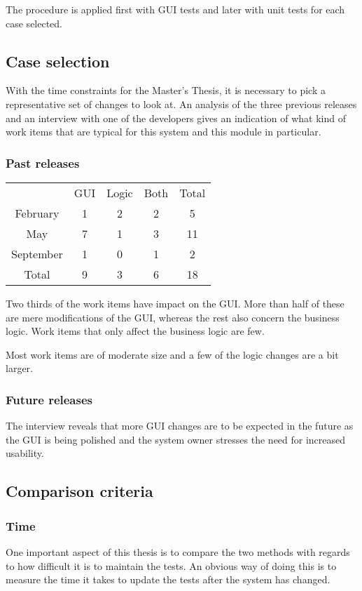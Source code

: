 \documentclass{article}
\begin{document}
		The procedure is applied first with GUI tests and later with unit tests for each case selected.

		\subsection{Case selection}
		With the time constraints for the Master's Thesis, it is necessary to pick a representative set of changes to look at.
		An analysis of the three previous releases and an interview with one of the developers gives an indication of what kind of work items that are typical for this system and this module in particular.

		\subsubsection{Past releases}
		
		\begin{tabular}{ c | c c c | c}
					 	& GUI & Logic & Both & Total\\
			February 	& 1 	& 2 	& 2 	& 5\\
			May 		& 7 	& 1 	& 3 	& 11\\
			September 	& 1 	& 0 	& 1 	& 2\\
			\hline
			Total 		& 9 	& 3 	& 6 	& 18\\
		\end{tabular}


		Two thirds of the work items have impact on the GUI. More than half of these are mere modifications of the GUI, whereas the rest also concern the business logic. Work items that only affect the business logic are few.

		Most work items are of moderate size and a few of the logic changes are a bit larger.
		
		\subsubsection{Future releases}
		The interview reveals that more GUI changes are to be expected in the future as the GUI is being polished and the system owner stresses the need for increased usability. 

		\subsection{Comparison criteria}
			\subsubsection{Time}
			One important aspect of this thesis is to compare the two methods with regards to how difficult it is to maintain the tests. An obvious way of doing this is to measure the time it takes to update the tests after the system has changed. 
\end{document}
